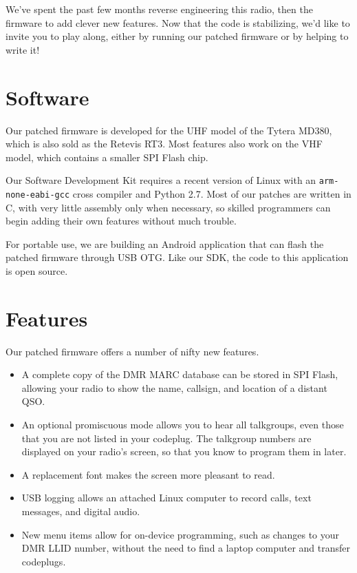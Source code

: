 \documentclass[
]{leaflet}
\begin{document}
We've spent the past few months reverse engineering this radio, then
the firmware to add clever new features.  Now that the code is
stabilizing, we'd like to invite you to play along, either by running
our patched firmware or by helping to write it!

\section{Software}

Our patched firmware is developed for the UHF model of the Tytera
MD380, which is also sold as the Retevis RT3.  Most features also
work on the VHF model, which contains a smaller SPI Flash chip.

Our Software Development Kit requires a recent version of Linux with
an {\tt arm-\-none-\-eabi-\-gcc} cross compiler and Python 2.7.  Most
of our patches are written in C, with very little assembly only when
necessary, so skilled programmers can begin adding their own features
without much trouble.

For portable use, we are building an Android application that can
flash the patched firmware through USB OTG.  Like our SDK, the code to
this application is open source.

\section{Features}

Our patched firmware offers a number of nifty new features.

\begin{itemize}

\item
A complete copy of the DMR MARC database can be stored in SPI Flash,
allowing your radio to show the name, callsign, and location of a
distant QSO.

\item
An optional promiscuous mode allows you to hear all talkgroups, even
those that you are not listed in your codeplug.  The talkgroup numbers
are displayed on your radio's screen, so that you know to program
them in later.

\item
A replacement font makes the screen more pleasant to read.

\item
USB logging allows an attached Linux computer to record calls, text
messages, and digital audio.

\item
New menu items allow for on-device programming, such as changes to
your DMR LLID number, without the need to find a laptop computer
and transfer codeplugs.

\end{itemize}
\end{document}
